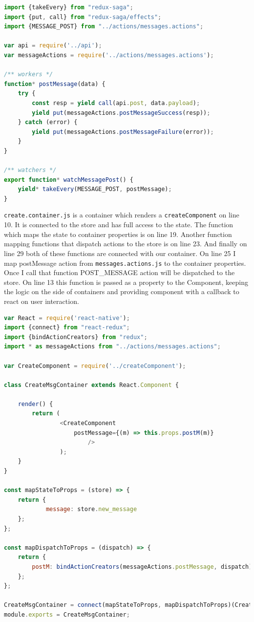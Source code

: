 \documentclass[thesis=M,english]{FITthesis}[2012/10/20]
\begin{document}
\begin{lstlisting}[language=JavaScript]
import {takeEvery} from "redux-saga";
import {put, call} from "redux-saga/effects";
import {MESSAGE_POST} from "../actions/messages.actions";

var api = require('../api');
var messageActions = require('../actions/messages.actions');

/** workers */
function* postMessage(data) {
    try {
        const resp = yield call(api.post, data.payload);
        yield put(messageActions.postMessageSuccess(resp));
    } catch (error) {
        yield put(messageActions.postMessageFailure(error));
    }
}

/** watchers */
export function* watchMessagePost() {
    yield* takeEvery(MESSAGE_POST, postMessage);
}
\end{lstlisting}

\verb|create.container.js| is a container which renders a \verb|createComponent| on line 10. It is connected to the store and has full access to the state. The function which maps the state to container properties is on line 19. Another function mapping functions that dispatch actions to the store is on line 23. And finally on line 29 both of these functions are connected with our container. On line 25 I map postMessage action from \verb|messages.actions.js| to the container properties. Once I call that function POST\_MESSAGE action will be dispatched to the store. On line 13 this function is passed as a property to the Component, keeping the logic on the side of containers and providing component with a callback to react on user interaction.

\begin{lstlisting}[language=JavaScript]
var React = require('react-native');
import {connect} from "react-redux";
import {bindActionCreators} from "redux";
import * as messageActions from "../actions/messages.actions";

var CreateComponent = require('../createComponent');

class CreateMsgContainer extends React.Component {

    render() {
        return ( 
        		<CreateComponent 
        			postMessage={(m) => this.props.postM(m)} 
						/>
				);
    }
}

const mapStateToProps = (store) => {
    return {
			message: store.new_message    
    };
};

const mapDispatchToProps = (dispatch) => {
    return {
        postM: bindActionCreators(messageActions.postMessage, dispatch)
    };
};

CreateMsgContainer = connect(mapStateToProps, mapDispatchToProps)(CreateMsgContainer);
module.exports = CreateMsgContainer;
\end{lstlisting}
\end{document}
